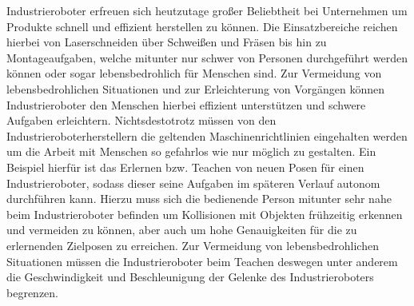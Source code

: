 Industrieroboter erfreuen sich heutzutage großer Beliebtheit bei Unternehmen um Produkte schnell und effizient herstellen zu können. Die Einsatzbereiche reichen hierbei von Laserschneiden über Schweißen und Fräsen bis hin zu Montageaufgaben, welche mitunter nur schwer von Personen durchgeführt werden können oder sogar lebensbedrohlich für Menschen sind. Zur Vermeidung von lebensbedrohlichen Situationen und zur Erleichterung von Vorgängen können Industrieroboter den Menschen hierbei effizient unterstützen und schwere Aufgaben erleichtern. Nichtsdestotrotz müssen von den Industrieroboterherstellern die geltenden Maschinenrichtlinien eingehalten werden um die Arbeit mit Menschen so gefahrlos wie nur möglich zu gestalten. Ein Beispiel hierfür ist das Erlernen bzw. Teachen von neuen Posen für einen Industrieroboter, sodass dieser seine Aufgaben im späteren Verlauf autonom durchführen kann. Hierzu muss sich die bedienende Person mitunter sehr nahe beim Industrieroboter befinden um Kollisionen mit Objekten frühzeitig erkennen und vermeiden zu können, aber auch um hohe Genauigkeiten für die zu erlernenden Zielposen zu erreichen. Zur Vermeidung von lebensbedrohlichen Situationen müssen die Industrieroboter beim Teachen deswegen unter anderem die Geschwindigkeit und Beschleunigung der Gelenke des Industrieroboters begrenzen.

